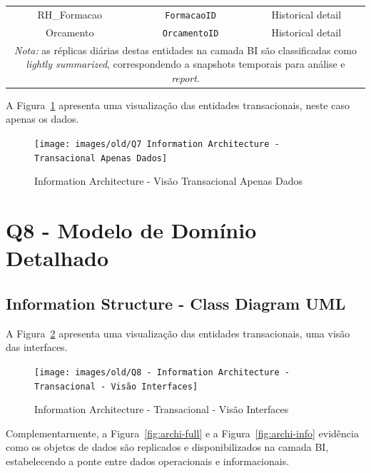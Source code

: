 \documentclass[12pt,a4paper,final]{article}
\begin{document}
\begin{table}[H]
\begin{tabular}{@{}|c|c|c|@{}}
            RH\_Formacao                   & \texttt{FormacaoID}        & Historical detail\\
            Orcamento                       & \texttt{OrcamentoID}    & Historical detail\\
            \midrule
            \multicolumn{3}{p{12cm}}{\textit{Nota:} as réplicas diárias destas entidades na
            camada BI são classificadas como \emph{lightly summarized}, correspondendo a
            snapshots temporais para análise e \textit{report}.}\\
            \bottomrule
        \end{tabular}
    \end{table}

    \newpage

    A Figura~\ref{fig:info-structure} apresenta uma visualização das entidades transacionais, neste caso apenas os
    dados.

    \begin{figure}[H]
        \centering
        \texttt{[image: images/old/Q7 Information Architecture - Transacional Apenas Dados]}
        \caption{Information Architecture - Visão Transacional Apenas Dados}
        \label{fig:info-structure}
    \end{figure}

    \newpage
    \section*{Q8 - Modelo de Domínio Detalhado}

    \subsection*{Information Structure - Class Diagram UML}\label{subsec:class-diagram-uml}
    A Figura~\ref{fig:uml-interfaces} apresenta uma visualização das entidades transacionais, uma visão das interfaces.

    \begin{figure}[H]
        \centering
        \texttt{[image: images/old/Q8 - Information Architecture - Transacional - Visão Interfaces]}
        \caption{Information Architecture - Transacional - Visão Interfaces}
        \label{fig:uml-interfaces}
    \end{figure}

    Complementarmente, a Figura~\ref{fig:archi-full} e a Figura~\ref{fig:archi-info} evidência
    como os objetos de dados são replicados e disponibilizados na camada BI,
    estabelecendo a ponte entre dados operacionais e informacionais.
\end{document}
